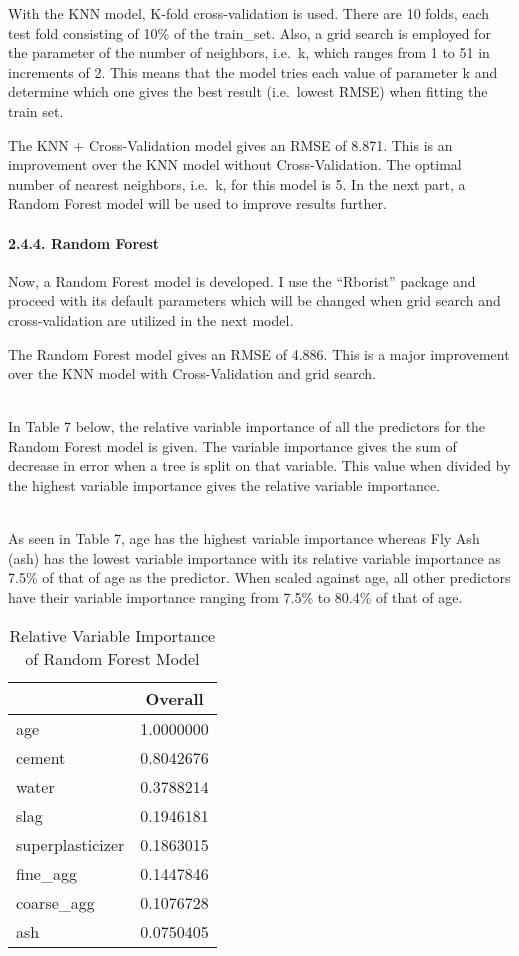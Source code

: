 \documentclass[
]{article}
\begin{document}
\hfill\break
With the KNN model, K-fold cross-validation is used. There are 10 folds,
each test fold consisting of 10\% of the train\_set. Also, a grid search
is employed for the parameter of the number of neighbors, i.e.~k, which
ranges from 1 to 51 in increments of 2. This means that the model tries
each value of parameter k and determine which one gives the best result
(i.e.~lowest RMSE) when fitting the train set.

The KNN + Cross-Validation model gives an RMSE of 8.871. This is an
improvement over the KNN model without Cross-Validation. The optimal
number of nearest neighbors, i.e.~k, for this model is 5. In the next
part, a Random Forest model will be used to improve results further.

\hypertarget{random-forest}{%
\paragraph{2.4.4. Random Forest}\label{random-forest}}

\hfill\break
Now, a Random Forest model is developed. I use the ``Rborist'' package
and proceed with its default parameters which will be changed when grid
search and cross-validation are utilized in the next model.

The Random Forest model gives an RMSE of 4.886. This is a major
improvement over the KNN model with Cross-Validation and grid search.\\
\strut \\
In Table 7 below, the relative variable importance of all the predictors
for the Random Forest model is given. The variable importance gives the
sum of decrease in error when a tree is split on that variable. This
value when divided by the highest variable importance gives the relative
variable importance.\\
\strut \\
As seen in Table 7, age has the highest variable importance whereas Fly
Ash (ash) has the lowest variable importance with its relative variable
importance as 7.5\% of that of age as the predictor. When scaled against
age, all other predictors have their variable importance ranging from
7.5\% to 80.4\% of that of age.

\begin{table}[H]

\caption{\label{tab:Variable Importance - RF}Relative Variable Importance of Random Forest Model}
\centering
\fontsize{11}{13}\selectfont
\begin{tabular}[t]{|>{}l|||>{}c|}
\hline
  & Overall\\
\hline
age & 1.0000000\\
\hline
cement & 0.8042676\\
\hline
water & 0.3788214\\
\hline
slag & 0.1946181\\
\hline
superplasticizer & 0.1863015\\
\hline
fine\_agg & 0.1447846\\
\hline
coarse\_agg & 0.1076728\\
\hline
ash & 0.0750405\\
\hline
\end{tabular}
\end{table}
\end{document}
